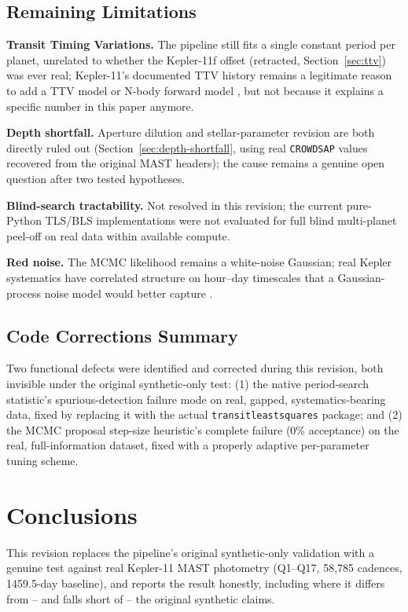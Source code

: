 \documentclass[11pt]{article}
\begin{document}
\subsection{Remaining Limitations}
\label{sec:limitations}

\textbf{Transit Timing Variations.} The pipeline still fits a single constant period per planet, unrelated to whether the Kepler-11f offset (retracted, Section~\ref{sec:ttv}) was ever real; Kepler-11's documented TTV history \citep{Lissauer2011,Ford2012} remains a legitimate reason to add a TTV model \citep{Lithwick2012} or N-body forward model \citep[TTVFast;][]{Deck2014}, but not because it explains a specific number in this paper anymore.

\textbf{Depth shortfall.} Aperture dilution and stellar-parameter revision are both directly ruled out (Section~\ref{sec:depth-shortfall}, using real \texttt{CROWDSAP} values recovered from the original MAST headers); the cause remains a genuine open question after two tested hypotheses.

\textbf{Blind-search tractability.} Not resolved in this revision; the current pure-Python TLS/BLS implementations were not evaluated for full blind multi-planet peel-off on real data within available compute.

\textbf{Red noise.} The MCMC likelihood remains a white-noise Gaussian; real Kepler systematics have correlated structure on hour--day timescales that a Gaussian-process noise model would better capture \citep{Aigrain2023}.

\subsection{Code Corrections Summary}

Two functional defects were identified and corrected during this revision, both invisible under the original synthetic-only test: (1) the native period-search statistic's spurious-detection failure mode on real, gapped, systematics-bearing data, fixed by replacing it with the actual \texttt{transitleastsquares} package; and (2) the MCMC proposal step-size heuristic's complete failure (0\% acceptance) on the real, full-information dataset, fixed with a properly adaptive per-parameter tuning scheme.

\section{Conclusions}

This revision replaces the pipeline's original synthetic-only validation with a genuine test against real Kepler-11 MAST photometry (Q1--Q17, 58{,}785 cadences, 1459.5-day baseline), and reports the result honestly, including where it differs from -- and falls short of -- the original synthetic claims.
\end{document}
